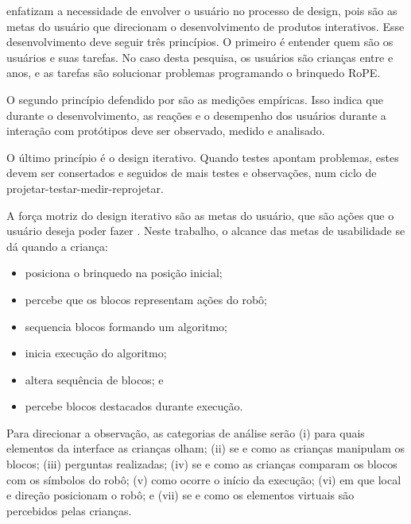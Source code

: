  enfatizam a necessidade de envolver o usuário no processo de design, pois são as metas do usuário que direcionam o desenvolvimento de produtos interativos. Esse desenvolvimento deve seguir três princípios. O primeiro é entender quem são os usuários e suas tarefas. No caso desta pesquisa, os usuários são crianças entre \idadeinicial e \idadefinal anos, e as tarefas são solucionar problemas programando o brinquedo RoPE. 

O segundo princípio defendido por  são as medições empíricas. Isso indica que durante o desenvolvimento, as reações e o desempenho dos usuários durante a interação com protótipos deve ser observado, medido e analisado. 

O último princípio é o design iterativo. Quando testes apontam problemas, estes devem ser consertados e seguidos de mais testes e observações, num ciclo de projetar-testar-medir-reprojetar. 

A força motriz do design iterativo são as metas do usuário, que são ações que o usuário deseja poder fazer \cite{rogers_design_2013}. Neste trabalho, o alcance das metas de usabilidade se dá quando a criança:

\begin{itemize}
    \item posiciona o brinquedo na posição inicial;
    \item percebe que os blocos representam ações do robô;
    \item sequencia blocos formando um algoritmo;
    \item inicia execução do algoritmo;
    \item altera sequência de blocos; e
    \item percebe blocos destacados durante execução.
\end{itemize}


Para direcionar a observação, as categorias de análise serão (i) 
para quais elementos da interface as crianças olham;
(ii) se e como as crianças manipulam os blocos; (iii) perguntas realizadas; (iv) se e como as crianças comparam os blocos com os símbolos do robô; (v) como ocorre o início da execução; (vi) em que local e direção posicionam o robô; e (vii) se e como os elementos virtuais são percebidos pelas crianças.

